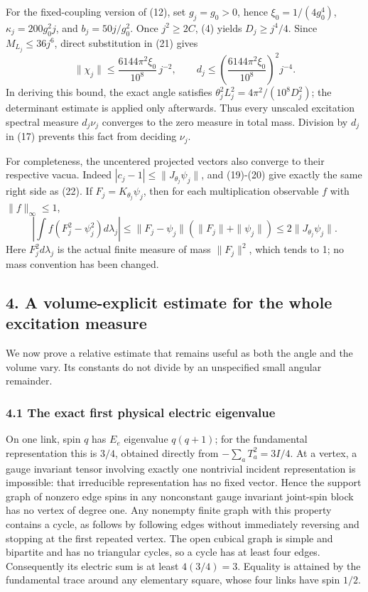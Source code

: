 \documentclass[
  11pt,
]{article}
\begin{document}
For the fixed-coupling version of (12), set \(g_j=g_0>0\), hence
\(\xi_0=1/(4g_0^4)\), \(\kappa_j=200g_0^2j\), and \(b_j=50j/g_0^2\).
Once \(j^2\ge2C\), (4) yields \(D_j\ge j^4/4\). Since
\(M_{L_j}\le36j^6\), direct substitution in (21) gives \[
 \boxed{\quad\|\chi_j\|\le
 \frac{6144\pi^2\xi_0}{10^8}\,j^{-2},\qquad
 d_j\le\left(\frac{6144\pi^2\xi_0}{10^8}\right)^2j^{-4}.\quad}
\tag{22}
\] In deriving this bound, the exact angle satisfies
\(\theta_j^2L_j^2=4\pi^2/(10^8D_j^2)\); the determinant estimate is
applied only afterwards. Thus every unscaled excitation spectral measure
\(d_j\nu_j\) converges to the zero measure in total mass. Division by
\(d_j\) in (17) prevents this fact from deciding \(\nu_j\).

For completeness, the uncentered projected vectors also converge to
their respective vacua. Indeed \(|c_j-1|\le\|J_{\theta_j}\psi_j\|\), and
(19)-(20) give exactly the same right side as (22). If
\(F_j=K_{\theta_j}\psi_j\), then for each multiplication observable
\(f\) with \(\|f\|_\infty\le1\), \[
 \left|\int f(F_j^2-\psi_j^2)d\lambda_j\right|
 \le\|F_j-\psi_j\|(\|F_j\|+\|\psi_j\|)
 \le2\|J_{\theta_j}\psi_j\|.
\tag{23}
\] Here \(F_j^2d\lambda_j\) is the actual finite measure of mass
\(\|F_j\|^2\), which tends to 1; no mass convention has been changed.

\subsection{4. A volume-explicit estimate for the whole excitation
measure}\label{a-volume-explicit-estimate-for-the-whole-excitation-measure}

We now prove a relative estimate that remains useful as both the angle
and the volume vary. Its constants do not divide by an unspecified small
angular remainder.

\subsubsection{4.1 The exact first physical electric
eigenvalue}\label{the-exact-first-physical-electric-eigenvalue}

On one link, spin \(q\) has \(E_e\) eigenvalue \(q(q+1)\); for the
fundamental representation this is \(3/4\), obtained directly from
\(-\sum_aT_a^2=3I/4\). At a vertex, a gauge invariant tensor involving
exactly one nontrivial incident representation is impossible: that
irreducible representation has no fixed vector. Hence the support graph
of nonzero edge spins in any nonconstant gauge invariant joint-spin
block has no vertex of degree one. Any nonempty finite graph with this
property contains a cycle, as follows by following edges without
immediately reversing and stopping at the first repeated vertex. The
open cubical graph is simple and bipartite and has no triangular cycles,
so a cycle has at least four edges. Consequently its electric sum is at
least \(4(3/4)=3\). Equality is attained by the fundamental trace around
any elementary square, whose four links have spin \(1/2\).
\end{document}
